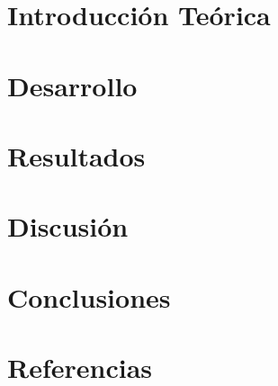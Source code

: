 \documentclass[a4paper]{article}
\begin{document}



\titulotp


\section{Introducci\'on Te\'orica}



\section{Desarrollo}



\section{Resultados}



\section{Discusi\'on}



\section{Conclusiones}




%

\section{Referencias}


\end{document}
